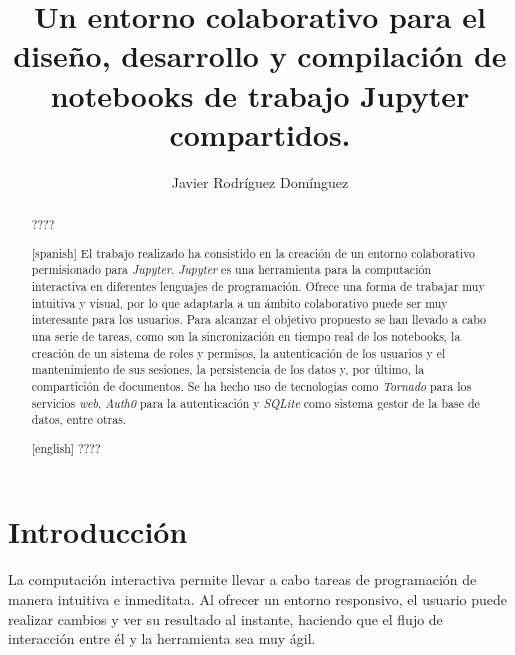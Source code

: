 \documentclass[11pt,spanish,listoffigures]{tfgetsinf}
\title{Un entorno colaborativo para el diseño, desarrollo y compilación de notebooks de trabajo Jupyter compartidos. }
\author{Javier Rodríguez Domínguez}
\begin{document}

\begin{abstract}
????
\end{abstract}
\begin{abstract}[spanish]
El trabajo realizado ha consistido en la creación de un entorno colaborativo permisionado para \textit{Jupyter}. \textit{Jupyter} es una herramienta para la computación interactiva en diferentes lenguajes de programación. Ofrece una forma de trabajar muy intuitiva y visual, por lo que adaptarla a un ámbito colaborativo puede ser muy interesante para los usuarios. Para alcanzar el objetivo propuesto se han llevado a cabo una serie de tareas, como son la sincronización en tiempo real de los notebooks, la creación de un sistema de roles y permisos, la autenticación de los usuarios y el mantenimiento de sus sesiones, la persistencia de los datos y, por último, la compartición de documentos. Se ha hecho uso de tecnologías como \textit{Tornado} para los servicios \textit{web}, \textit{Auth0} para la autenticación y \textit{SQLite} como sistema gestor de la base de datos, entre otras. 
\end{abstract}
\begin{abstract}[english]
????
\end{abstract}


\mainmatter





\chapter{Introducci\'on}
\label{ch:intro}

La computación interactiva permite llevar a cabo tareas de programación de manera intuitiva e inmeditata. Al ofrecer un entorno responsivo, el usuario puede realizar cambios y ver su resultado al instante, haciendo que el flujo de interacción entre él y la herramienta sea muy ágil.
\end{document}
